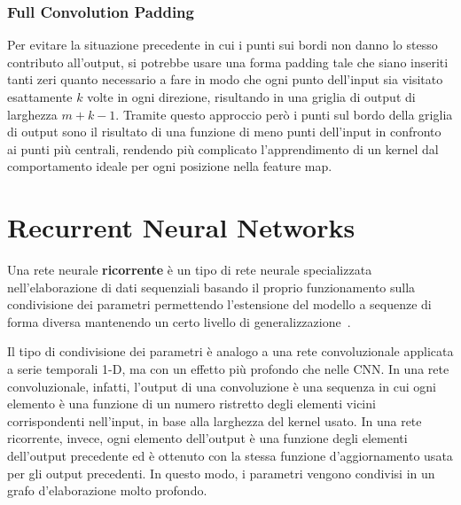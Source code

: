 \documentclass[12pt,a4paper]{report}
\begin{document}
    \subsubsection{Full Convolution Padding}
    Per evitare la situazione precedente in cui i punti sui bordi
    non danno lo stesso contributo all'output, si potrebbe usare
    una forma padding tale che siano inseriti tanti zeri quanto
    necessario a fare in modo che ogni punto dell'input sia 
    visitato esattamente $k$ volte in ogni direzione, risultando in
    una griglia di output di larghezza $m+k-1$. Tramite questo
    approccio per\`o i punti sul bordo della griglia di output sono
    il risultato di una funzione di meno punti dell'input in 
    confronto ai punti pi\`u centrali, rendendo pi\`u complicato
    l'apprendimento di un kernel dal comportamento ideale per ogni
    posizione nella feature map. 

    \section{Recurrent Neural Networks}
    Una rete neurale \textbf{ricorrente} \`e un tipo di rete 
    neurale specializzata nell'elaborazione di dati sequenziali 
    basando il proprio funzionamento sulla condivisione dei 
    parametri permettendo l'estensione del modello a sequenze di
    forma diversa mantenendo un certo livello di generalizzazione~\cite{Rumelhart1986}.

    Il tipo di condivisione dei parametri \`e analogo a una rete 
    convoluzionale applicata a serie temporali 1-D, ma con un 
    effetto pi\`u profondo che nelle CNN. In una rete 
    convoluzionale, infatti, l'output di una convoluzione \`e una 
    sequenza in cui ogni elemento \`e una funzione di un numero 
    ristretto degli elementi vicini corrispondenti nell'input, in
    base alla larghezza del kernel usato. In una rete ricorrente,
    invece, ogni elemento dell'output \`e una funzione degli
    elementi dell'output precedente ed \`e ottenuto con la stessa 
    funzione d'aggiornamento usata per gli output precedenti. 
    In questo modo, i parametri vengono condivisi in un grafo
    d'elaborazione molto profondo.
\end{document}
